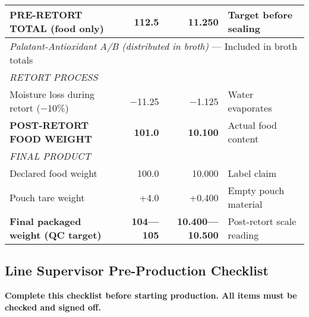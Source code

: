 \begin{table}[h]
\begin{tabular}{@{}lrrl@{}}
\textbf{PRE-RETORT TOTAL (food only)} & \textbf{112.5} & \textbf{11.250} & Target before sealing \\
\midrule
\multicolumn{4}{l}{\textit{Palatant-Antioxidant A/B (distributed in broth)} --- Included in broth totals} \\
\midrule
\multicolumn{4}{l}{\textit{RETORT PROCESS}} \\
Moisture loss during retort ($-$10\%) & $-$11.25 & $-$1.125 & Water evaporates \\
\textbf{POST-RETORT FOOD WEIGHT} & \textbf{101.0} & \textbf{10.100} & Actual food content \\
\midrule
\multicolumn{4}{l}{\textit{FINAL PRODUCT}} \\
Declared food weight & 100.0 & 10.000 & Label claim \\
Pouch tare weight & +4.0 & +0.400 & Empty pouch material \\
\textbf{Final packaged weight (QC target)} & \textbf{104---105} & \textbf{10.400---10.500} & Post-retort scale reading \\
\bottomrule
\end{tabular}
\end{table}

\clearpage


\subsection*{Line Supervisor Pre-Production Checklist}

\textbf{Complete this checklist before starting production. All items must be checked and signed off.}

